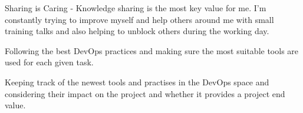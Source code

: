 \documentclass[9pt]{style/developercv}
\begin{document}
\begin{minipage}[t]{0.3\textwidth}
	\vspace{-\baselineskip}


  Sharing is Caring - Knowledge sharing is the most key value for me.
  I'm constantly trying to improve myself and help others around me with small training talks and also helping to unblock others during the working day.

\end{minipage}
\hfill
\begin{minipage}[t]{0.3\textwidth}
	\vspace{-\baselineskip}

	Following the best DevOps practices and making sure the most suitable tools are used for each given task.

\end{minipage}
\hfill
\begin{minipage}[t]{0.3\textwidth}
	\vspace{-\baselineskip}

  Keeping track of the newest tools and practises in the DevOps space and considering their impact on the project and whether it provides a project end value.

\end{minipage}
\vspace{0.75cm}

\end{document}

